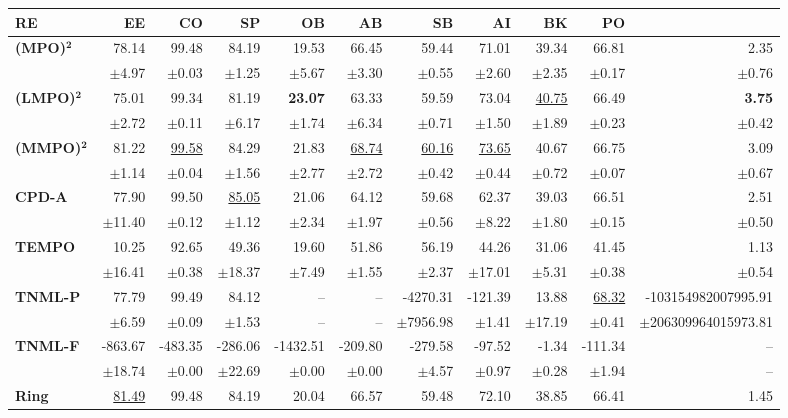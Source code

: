 \begin{table}[!htbp]
\centering
\scriptsize
\begin{tabular}{lrrrrrrrrrr}
\toprule
RE & EE & CO & SP & OB & AB & SB & AI & BK & PO \\
\midrule
\textbf{(MPO)}$\bm{^2}$ & 78.14 & 99.48 & 84.19 & 19.53 & 66.45 & 59.44 & 71.01 & 39.34 & 66.81 & 2.35 \\
 & $\pm$4.97 & $\pm$0.03 & $\pm$1.25 & $\pm$5.67 & $\pm$3.30 & $\pm$0.55 & $\pm$2.60 & $\pm$2.35 & $\pm$0.17 & $\pm$0.76 \\
\midrule
\textbf{(LMPO)}$\bm{^2}$ & 75.01 & 99.34 & 81.19 & \textbf{23.07} & 63.33 & 59.59 & 73.04 & \underline{40.75} & 66.49 & \textbf{3.75} \\
 & $\pm$2.72 & $\pm$0.11 & $\pm$6.17 & $\pm$1.74 & $\pm$6.34 & $\pm$0.71 & $\pm$1.50 & $\pm$1.89 & $\pm$0.23 & $\pm$0.42 \\
\midrule
\textbf{(MMPO)}$\bm{^2}$ & 81.22 & \underline{99.58} & 84.29 & 21.83 & \underline{68.74} & \underline{60.16} & \underline{73.65} & 40.67 & 66.75 & 3.09 \\
 & $\pm$1.14 & $\pm$0.04 & $\pm$1.56 & $\pm$2.77 & $\pm$2.72 & $\pm$0.42 & $\pm$0.44 & $\pm$0.72 & $\pm$0.07 & $\pm$0.67 \\
\midrule
\textbf{CPD-A} & 77.90 & 99.50 & \underline{85.05} & 21.06 & 64.12 & 59.68 & 62.37 & 39.03 & 66.51 & 2.51 \\
 & $\pm$11.40 & $\pm$0.12 & $\pm$1.12 & $\pm$2.34 & $\pm$1.97 & $\pm$0.56 & $\pm$8.22 & $\pm$1.80 & $\pm$0.15 & $\pm$0.50 \\
\midrule
\textbf{TEMPO} & 10.25 & 92.65 & 49.36 & 19.60 & 51.86 & 56.19 & 44.26 & 31.06 & 41.45 & 1.13 \\
 & $\pm$16.41 & $\pm$0.38 & $\pm$18.37 & $\pm$7.49 & $\pm$1.55 & $\pm$2.37 & $\pm$17.01 & $\pm$5.31 & $\pm$0.38 & $\pm$0.54 \\
\midrule
\textbf{TNML-P} & 77.79 & 99.49 & 84.12 & -- & -- & -4270.31 & -121.39 & 13.88 & \underline{68.32} & -103154982007995.91 \\
 & $\pm$6.59 & $\pm$0.09 & $\pm$1.53 & -- & -- & $\pm$7956.98 & $\pm$1.41 & $\pm$17.19 & $\pm$0.41 & $\pm$206309964015973.81 \\
\midrule
\textbf{TNML-F} & -863.67 & -483.35 & -286.06 & -1432.51 & -209.80 & -279.58 & -97.52 & -1.34 & -111.34 & -- \\
 & $\pm$18.74 & $\pm$0.00 & $\pm$22.69 & $\pm$0.00 & $\pm$0.00 & $\pm$4.57 & $\pm$0.97 & $\pm$0.28 & $\pm$1.94 & -- \\
\midrule
\textbf{Ring} & \underline{81.49} & 99.48 & 84.19 & 20.04 & 66.57 & 59.48 & 72.10 & 38.85 & 66.41 & 1.45 \\

\end{tabular}
\end{table}
